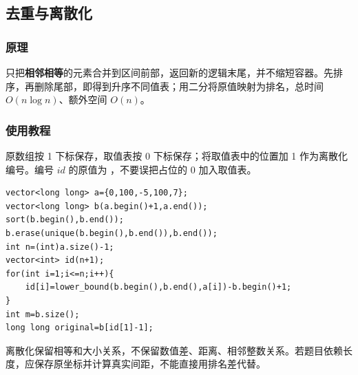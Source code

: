 \subsection{去重与离散化}
\label{stl:discretize}
\subsubsection*{原理}
 只把\textbf{相邻相等}的元素合并到区间前部，返回新的逻辑末尾，并不缩短容器。先排序，再删除尾部，即得到升序不同值表；用二分将原值映射为排名，总时间 $O(n\log n)$、额外空间 $O(n)$。
\subsubsection*{使用教程}
原数组按 1 下标保存，取值表按 0 下标保存；将取值表中的位置加 1 作为离散化编号。编号 $id$ 的原值为 ，不要误把占位的 0 加入取值表。
\begin{lstlisting}[style=mtycpp,numbers=none]
vector<long long> a={0,100,-5,100,7};
vector<long long> b(a.begin()+1,a.end());
sort(b.begin(),b.end());
b.erase(unique(b.begin(),b.end()),b.end());
int n=(int)a.size()-1;
vector<int> id(n+1);
for(int i=1;i<=n;i++){
	id[i]=lower_bound(b.begin(),b.end(),a[i])-b.begin()+1;
}
int m=b.size();
long long original=b[id[1]-1];
\end{lstlisting}
离散化保留相等和大小关系，不保留数值差、距离、相邻整数关系。若题目依赖长度，应保存原坐标并计算真实间距，不能直接用排名差代替。
